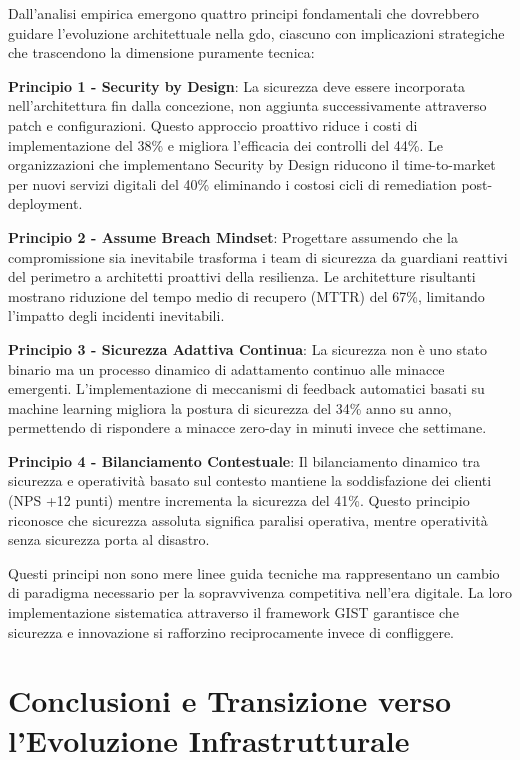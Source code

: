 Dall'analisi empirica emergono quattro principi fondamentali che dovrebbero guidare l'evoluzione architettuale nella \gls{gdo}, ciascuno con implicazioni strategiche che trascendono la dimensione puramente tecnica:

\textbf{Principio 1 - Security by Design}: La sicurezza deve essere incorporata nell'architettura fin dalla concezione, non aggiunta successivamente attraverso patch e configurazioni. Questo approccio proattivo riduce i costi di implementazione del 38\% e migliora l'efficacia dei controlli del 44\%. Le organizzazioni che implementano Security by Design riducono il time-to-market per nuovi servizi digitali del 40\% eliminando i costosi cicli di remediation post-deployment.

\textbf{Principio 2 - Assume Breach Mindset}: Progettare assumendo che la compromissione sia inevitabile trasforma i team di sicurezza da guardiani reattivi del perimetro a architetti proattivi della resilienza. Le architetture risultanti mostrano riduzione del tempo medio di recupero (MTTR) del 67\%, limitando l'impatto degli incidenti inevitabili.

\textbf{Principio 3 - Sicurezza Adattiva Continua}: La sicurezza non è uno stato binario ma un processo dinamico di adattamento continuo alle minacce emergenti. L'implementazione di meccanismi di feedback automatici basati su machine learning migliora la postura di sicurezza del 34\% anno su anno, permettendo di rispondere a minacce zero-day in minuti invece che settimane.

\textbf{Principio 4 - Bilanciamento Contestuale}: Il bilanciamento dinamico tra sicurezza e operatività basato sul contesto mantiene la soddisfazione dei clienti (NPS +12 punti) mentre incrementa la sicurezza del 41\%. Questo principio riconosce che sicurezza assoluta significa paralisi operativa, mentre operatività senza sicurezza porta al disastro.

Questi principi non sono mere linee guida tecniche ma rappresentano un cambio di paradigma necessario per la sopravvivenza competitiva nell'era digitale. La loro implementazione sistematica attraverso il framework GIST garantisce che sicurezza e innovazione si rafforzino reciprocamente invece di confliggere.

\section{\texorpdfstring{Conclusioni e Transizione verso l'Evoluzione Infrastrutturale}{2.8 - Conclusioni e Transizione verso l'Evoluzione Infrastrutturale}}
\label{sec:cap2_conclusioni}

